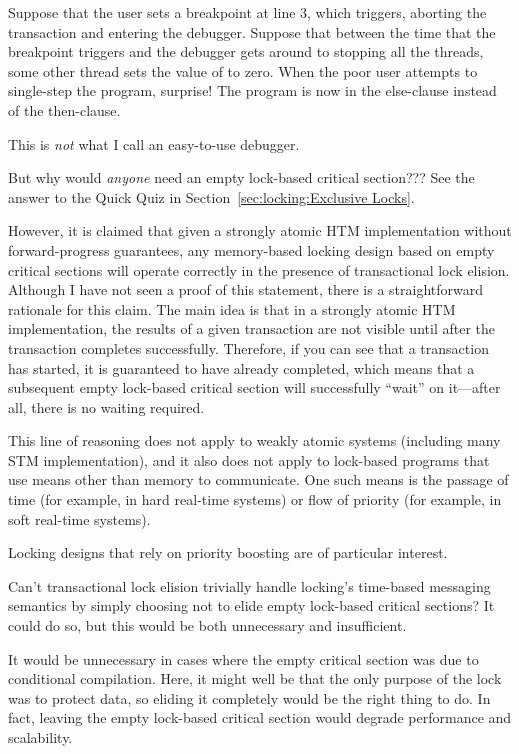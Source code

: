 	Suppose that the user sets a breakpoint at line 3, which triggers,
	aborting the transaction and entering the debugger.
	Suppose that between the time that the breakpoint triggers
	and the debugger gets around to stopping all the threads, some
	other thread sets the value of  to zero.
	When the poor user attempts to single-step the program, surprise!
	The program is now in the else-clause instead of the then-clause.

	This is \emph{not} what I call an easy-to-use debugger.

\QuickQ{}
	But why would \emph{anyone} need an empty lock-based critical
	section???
\QuickA{}
	See the answer to the Quick Quiz in
	Section~\ref{sec:locking:Exclusive Locks}.

	However, it is claimed that given a strongly atomic HTM
	implementation without forward-progress guarantees, any
	memory-based locking design based on empty critical sections
	will operate correctly in the presence of transactional
	lock elision.
	Although I have not seen a proof of this statement, there
	is a straightforward rationale for this claim.
	The main idea is that in a strongly atomic HTM implementation,
	the results of a given transaction are not visible until
	after the transaction completes successfully.
	Therefore, if you can see that a transaction has started,
	it is guaranteed to have already completed, which means
	that a subsequent empty lock-based critical section will
	successfully ``wait'' on it---after all, there is no waiting
	required.

	This line of reasoning does not apply to weakly atomic
	systems (including many STM implementation), and it also
	does not apply to lock-based programs that use means other
	than memory to communicate.
	One such means is the passage of time (for example, in
	hard real-time systems) or flow of priority (for example,
	in soft real-time systems).

	Locking designs that rely on priority boosting are of particular
	interest.

\QuickQ{}
	Can't transactional lock elision trivially handle locking's
	time-based messaging semantics
	by simply choosing not to elide empty lock-based critical sections?
\QuickA{}
	It could do so, but this would be both unnecessary and
	insufficient.

	It would be unnecessary in cases where the empty critical section
	was due to conditional compilation.
	Here, it might well be that the only purpose of the lock was to
	protect data, so eliding it completely would be the right thing
	to do.
	In fact, leaving the empty lock-based critical section would
	degrade performance and scalability.


